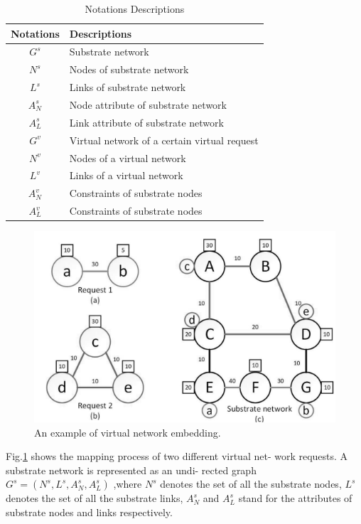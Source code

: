 \documentclass[12pt]{article}
\begin{document}
\begin{table}[t!]
	\centering
	\begin{tabular}{|c l|} 
		\hline
		Notations & Descriptions \\ [0.5ex] 
		\hline 
		$G^s$ & Substrate network\\ 
		$N^s$ & Nodes of substrate network \\
		$L^s$ & Links of substrate network \\
		$A_N^s$& Node attribute of substrate network\\
		$A_L^s$&Link attribute of substrate network\\
		$G^v$& Virtual network of a certain virtual request\\
		$N^v$&Nodes of a virtual network\\
		$L^v$& Links of a virtual network\\
		$A^v_N$& Constraints of substrate nodes\\
		$A^v_L$& Constraints of substrate nodes\\
		\hline
	\end{tabular}
	\caption{Notations Descriptions}
	\label{table:2}
\end{table}
\begin{figure}[t!] \label{fig:1}
 \includegraphics[width=\linewidth]{fig1.png}
\caption{An example of virtual network embedding.}
\end{figure}

Fig.\ref{fig:1} shows the mapping process of two different virtual net-
work requests. A substrate network is represented as an undi-
rected graph $G^s = (N^s, L^s, A_N^s, A_L^s)$ ,where $N^s$ denotes the set of all
the substrate nodes, $L^s$ denotes the set of all the substrate links,
$A^s_N$ and $A_L^s$ stand for the attributes of substrate nodes and links
respectively.
\end{document}
